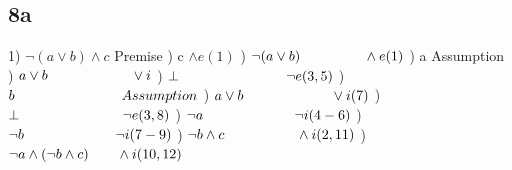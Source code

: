 \documentclass{article}
\begin{document}
	\subsection*{8a}
	1) $\neg (a \lor b) \land c$ \hspace{10mm}Premise
	) c  \hspace{25mm} $\land e (1)$
	) $ \neg (a \lor b) \hspace{16mm} \land e (1)$
	) \hspace{25mm}a \hspace{25mm} Assumption
	)\hspace{25mm} $ a \lor b \hspace{21mm} \lor i$
	) \hspace{25mm}$ \bot \hspace{27mm} \neg e (3,5)$
	)\hspace{25mm} $ b \hspace{27mm} Assumption$
	) \hspace{25mm}$ a \lor b \hspace{22mm} \lor i (7) $
	) \hspace{25mm}$ \bot \hspace{26mm} \neg e (3,8) $
	) $ \neg a \hspace{23mm} \neg i (4-6) $
	) $ \neg b \hspace{23mm} \neg i (7-9) $
	) $ \neg b \land c \hspace{18mm} \land i (2,11)$
	) $ \neg a \land (\neg b \land c) \hspace{7 mm} \land i (10,12) $
	\newline
	\newline
	\newline
\end{document}
